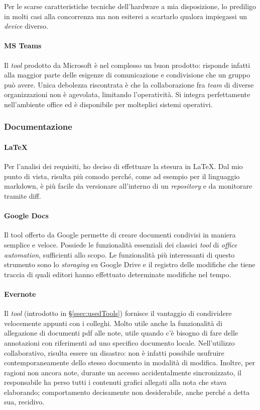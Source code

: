 Per le scarse caratteristiche tecniche dell'hardware a mia disposizione, lo prediligo in molti casi alla concorrenza ma non esiterei a scartarlo qualora impiegassi un \textit{device} diverso.
\paragraph{MS Teams}
Il \textit{tool} prodotto da Microsoft è nel complesso un buon prodotto: risponde infatti alla maggior parte delle esigenze di comunicazione e condivisione che un gruppo può avere. Unica debolezza riscontrata è che la collaborazione fra \textit{team} di diverse organizzazioni non è agevolata, limitando l'operatività.
Si integra perfettamente nell'ambiente \gls{office} ed è disponibile per molteplici sistemi operativi.
\subsubsection{Documentazione}
\paragraph{\LaTeX}
Per l'analisi dei requisiti, ho deciso di effettuare la stesura in \LaTeX.
Dal mio punto di vista, risulta più comodo perché, come ad esempio per il linguaggio \gls{markdown}\glsfirstoccur, è più facile da versionare all'interno di un \textit{repository} e da monitorare tramite \gls{diff}\glsfirstoccur.
\paragraph{Google Docs}
Il tool offerto da Google permette di creare documenti condivisi in maniera semplice e veloce. Possiede le funzionalità essenziali dei classici \textit{tool} di \textit{office automation}, sufficienti allo scopo. Le funzionalità più interessanti di questo strumento sono lo \textit{storaging} su Google Drive e il registro delle modifiche che tiene traccia di quali editori hanno effettuato determinate modifiche nel tempo.
\newpage
\paragraph{Evernote}
Il \textit{tool} (introdotto in \S\ref{ssec:usedTools}) fornisce il vantaggio di condividere velocemente appunti con i colleghi. Molto utile anche la funzionalità di allegazione di documenti pdf alle note, utile quando c'è bisogno di fare delle annotazioni con riferimenti ad uno specifico documento locale. Nell'utilizzo collaborativo, risulta essere un disastro: non è infatti possibile usufruire contemporaneamente dello stesso documento in modalità di modifica. Inoltre, per ragioni non ancora note, durante un accesso accidentalmente sincronizzato, il responsabile ha perso tutti i contenuti grafici allegati alla nota che stava elaborando; comportamento decisamente non desiderabile, anche perché a detta sua, recidivo.


